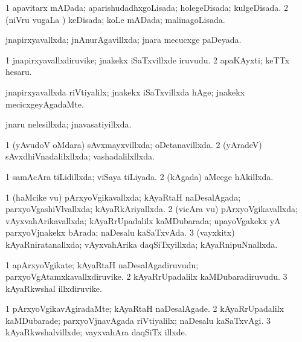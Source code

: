 {{\bentry
{} 
\gl{\gu}
\expl{}
\bmng
\bnum
\num{1} apavitarx mADada; aparishudadhxgoLisada; holegeDisada; kulgeDisada. 
\num{2} (niVru \mo vugaLa \vi) keDisada; koLe mADada; malinagoLisada. 
\enum
\emng
\eentry

\bentry
{} 
\gl{\gu}
\expl{}
\bmng
jnapirxyavallxda; jnAnurAgavillxda; jnara mecucxge paDeyada. 
\emng
\eentry

\bentry
{} 
\gl{\nA}
\expl{}
\bmng
\bnum
\num{1} jnapirxyavallxdiruvike; jnakekx iSaTxvillxde iruvudu. 
\num{2} apaKAyxti; keTTx hesaru. 
\enum
\emng
\eentry

\bentry
{} 
\gl{\kirxvi}
\expl{}
\bmng
jnapirxyavallxda riVtiyalilx; jnakekx iSaTxvillxda hAge; jnakekx mecicxgeyAgadaMte. 
\emng
\eentry

\bentry
{} 
\gl{\gu}
\expl{}
\bmng
jnaru nelesillxda; jnavasatiyillxda. 
\emng
\eentry

\bentry
{} 
\gl{\gu}
\expl{}
\bmng
\bnum
\num{1} (yAvudoV oMdara) sAvxmayxvillxda; oDetanavillxda. 
\num{2} (yAradeV) sAvxdhiVnadalilxllxda; vashadalilxllxda. 
\enum
\emng
\eentry

\bentry
{} 
\gl{\gu}
\expl{}
\bmng
\bnum
\num{1} samAcAra tiLidillxda; viSaya tiLiyada. 
\num{2} (kAgada) aMcege hAkillxda. 
\enum
\emng
\eentry

\bentry
{} 
\gl{\gu}
\expl{}
\bmng
\bnum
\num{1} (haMcike \mo vu) pArxyoVgikavallxda; kAyaRtaH naDesalAgada; parxyoVgashiVlvallxda; kAyaRkAriyallxda. 
\num{2} (vicAra \mo vu) pArxyoVgikavallxda; vAyxvahArikavallxda; kAyaRrUpadalilx kaMDubarada; upayoVgakekx yA parxyoVjnakekx bArada; naDesalu kaSaTxvAda. 
\num{3} (vayxkitx) kAyaRniratanallxda; vAyxvahArika daqSiTxyillxda; kAyaRnipuNnallxda. 
\enum
\emng
\eentry

\bentry
{} 
\gl{\nA}
\expl{}
\bmng
\bnum
\num{1} apArxyoVgikate; kAyaRtaH naDesalAgadiruvudu; parxyoVgAtamxkavallxdiruvike. 
\num{2} kAyaRrUpadalilx kaMDubaradiruvudu. 
\num{3} kAyaRkwshal illxdiruvike. 
\enum
\emng
\eentry

\bentry
{} 
\gl{\kirxvi}
\expl{}
\bmng
\bnum
\num{1} pArxyoVgikavAgiradaMte; kAyaRtaH naDesalAgade. 
\num{2} kAyaRrUpadalilx kaMDubarade; parxyoVjnavAgada riVtiyalilx; naDesalu kaSaTxvAgi. 
\num{3} kAyaRkwshalvillxde; vayxvahAra daqSiTx illxde. 
\enum
\emng
\eentry

}}
